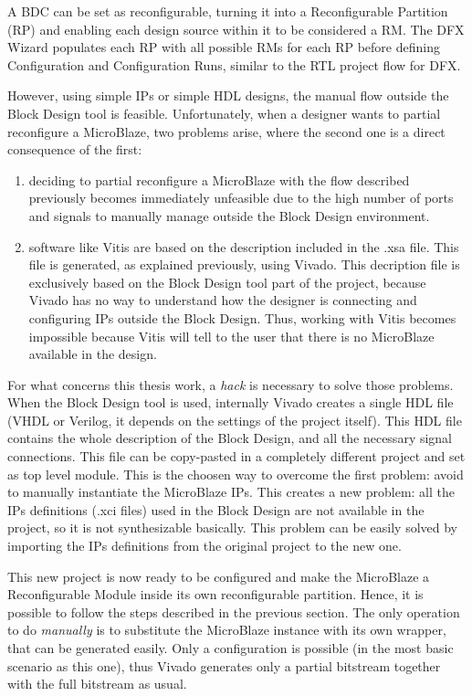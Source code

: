 A BDC can be set as reconfigurable, turning it into a Reconfigurable Partition (RP) and enabling each design source within it to be considered a RM. The DFX Wizard populates each RP with all possible RMs for each RP before defining Configuration and Configuration Runs, similar to the RTL project flow for DFX. \bigskip

However, using simple IPs or simple HDL designs, the manual flow outside the Block Design tool is feasible. Unfortunately, when a designer wants to partial reconfigure a MicroBlaze, two problems arise, where the second one is a direct consequence of the first:

\begin{enumerate}
    \item deciding to partial reconfigure a MicroBlaze with the flow described previously becomes immediately unfeasible due to the high number of ports and signals to manually manage outside the Block Design environment. 
    \item software like Vitis are based on the description included in the .xsa file. This file is generated, as explained previously, using Vivado. This decription file is exclusively based on the Block Design tool part of the project, because Vivado has no way to understand how the designer is connecting and configuring IPs outside the Block Design. Thus, working with Vitis becomes impossible because Vitis will tell to the user that there is no MicroBlaze available in the design. 
\end{enumerate}

For what concerns this thesis work, a \textit{hack} is necessary to solve those problems. When the Block Design tool is used, internally Vivado creates a single HDL file (VHDL or Verilog, it depends on the settings of the project itself). This HDL file contains the whole description of the Block Design, and all the necessary signal connections. This file can be copy-pasted in a completely different project and set as top level module. This is the choosen way to overcome the first problem: avoid to manually instantiate the MicroBlaze IPs. This creates a new problem: all the IPs definitions (.xci files) used in the Block Design are not available in the project, so it is not synthesizable basically. This problem can be easily solved by importing the IPs definitions from the original project to the new one. \bigskip

This new project is now ready to be configured and make the MicroBlaze a Reconfigurable Module inside its own reconfigurable partition. Hence, it is possible to follow the steps described in the previous section. The only operation to do \textit{manually} is to substitute the MicroBlaze instance with its own wrapper, that can be generated easily. Only a configuration is possible (in the most basic scenario as this one), thus Vivado generates only a partial bitstream together with the full bitstream as usual.\bigskip

